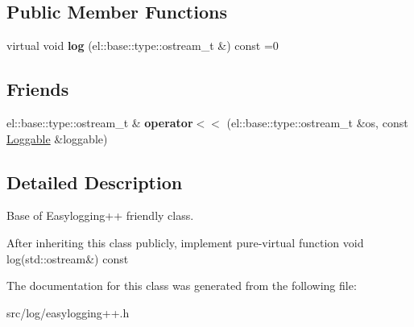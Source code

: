 \subsection*{Public Member Functions}
\begin{DoxyCompactItemize}
\item 
virtual void {\bfseries log} (el\+::base\+::type\+::ostream\+\_\+t \&) const =0\hypertarget{classel_1_1Loggable_ad8a2e0ebc11e4bd00ef49fc67db3d59e}{}\label{classel_1_1Loggable_ad8a2e0ebc11e4bd00ef49fc67db3d59e}

\end{DoxyCompactItemize}
\subsection*{Friends}
\begin{DoxyCompactItemize}
\item 
el\+::base\+::type\+::ostream\+\_\+t \& {\bfseries operator$<$$<$} (el\+::base\+::type\+::ostream\+\_\+t \&os, const \hyperlink{classel_1_1Loggable}{Loggable} \&loggable)\hypertarget{classel_1_1Loggable_a00722a386f498be3ebece2e266fb0f05}{}\label{classel_1_1Loggable_a00722a386f498be3ebece2e266fb0f05}

\end{DoxyCompactItemize}


\subsection{Detailed Description}
Base of Easylogging++ friendly class. 

After inheriting this class publicly, implement pure-\/virtual function {\ttfamily void log(std\+::ostream\&) const} 

The documentation for this class was generated from the following file\+:\begin{DoxyCompactItemize}
\item 
src/log/easylogging++.\+h\end{DoxyCompactItemize}
